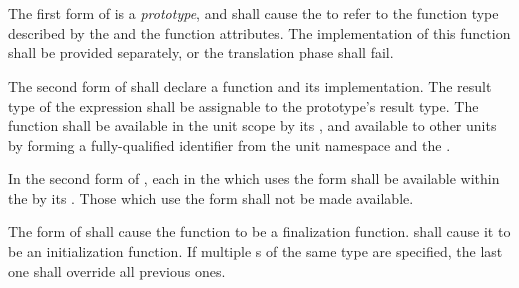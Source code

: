 \begin{grammar}
 \\
	    \\
	    \terminal{=}  \\

 \\
	 \\
	  \\

 \\
	 \\
	 \\
	 \\
	 \\
	 \\
\end{grammar}

\specsubsubitem
The first form of  is a \textit{prototype},
and shall cause the  to refer to the function type
described by the  and the function attributes. The
implementation of this function shall be provided separately, or the
translation phase shall fail.

\specsubsubitem
The second form of  shall declare a function
and its implementation. The result type of the expression shall be assignable
to the prototype's result type. The function shall be available in the unit
scope by its , and available to other units by forming a
fully-qualified identifier from the unit namespace and the .

\specsubsubitem
In the second form of , each
 in the  which uses the
 form shall be available within the 
by its . Those which use the \terminal{\_} form shall not be
made available.

\specsubsubitem
The  form of  shall cause the
function to be a finalization function.  shall cause it to be an
initialization function. If multiple s of the same type
are specified, the last one shall override all previous ones.

